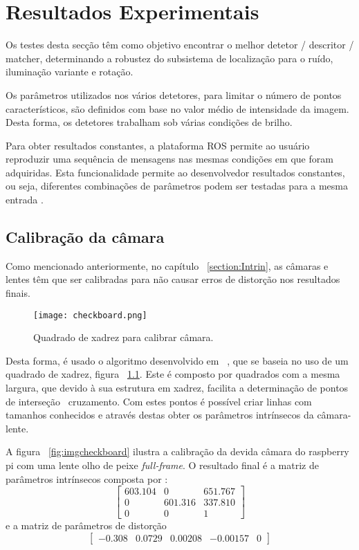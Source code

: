 \chapter{Resultados Experimentais} \label{chap:resexp}


Os testes desta secção têm como objetivo encontrar o melhor detetor / descritor / matcher, determinando a robustez do subsistema de localização para o ruído, iluminação variante e rotação.

Os parâmetros utilizados nos vários detetores, para limitar o número de pontos característicos, são definidos com base no valor médio de intensidade da imagem. Desta forma, os detetores trabalham sob várias condições de brilho.

Para obter resultados constantes, a plataforma ROS permite ao usuário reproduzir uma sequência de mensagens nas mesmas condições em que foram adquiridas. Esta funcionalidade permite ao desenvolvedor resultados constantes, ou seja, diferentes combinações de parâmetros podem ser testadas para a mesma entrada .

\section{Calibração da câmara}

Como mencionado anteriormente, no capítulo ~\ref{section:Intrin}, as câmaras e lentes têm que ser calibradas para não causar erros de distorção nos resultados finais. 

\begin{figure}[h!]  %
	\centering
	\texttt{[image: checkboard.png]} 
	\caption{Quadrado de xadrez para calibrar câmara.}
	\label{fig:checkboard}  %
\end{figure}

Desta forma, é usado o algoritmo desenvolvido em ~\cite{piCam}, que se baseia no uso de um quadrado de xadrez, figura ~\ref{fig:checkboard}. Este é composto por quadrados com a mesma largura, que devido à sua estrutura em  xadrez, facilita a determinação de pontos de interseção \ cruzamento. Com estes pontos é possível criar linhas com tamanhos conhecidos e através destas obter os parâmetros intrínsecos da câmara-lente. 



A figura ~\ref{fig:imgcheckboard} ilustra a calibração da devida câmara do raspberry pi com uma lente olho de peixe \textit{full-frame}. O resultado final é a matriz de parâmetros intrínsecos composta por : \[ \left[ \begin{array}{ccc}
603.104 & 0 & 651.767 \\ 
0 & 601.316 & 337.810 \\ 
0 & 0 & 1
\end{array} \right] \] e a matriz de parâmetros de distorção \[ \left[\begin{array}{ccccc}
-0.308 & 0.0729 & 0.00208 & -0.00157 & 0 
\end{array} \right] \]

